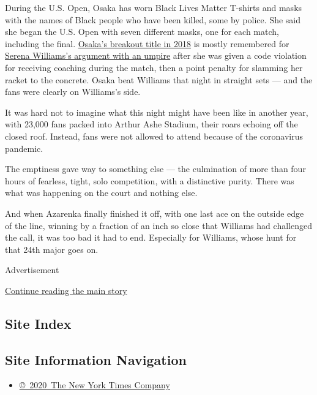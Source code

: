 During the U.S. Open, Osaka has worn Black Lives Matter T-shirts and
masks with the names of Black people who have been killed, some by
police. She said she began the U.S. Open with seven different masks, one
for each match, including the final.
\href{https://www.nytimes3xbfgragh.onion/2018/09/10/sports/tennis/us-open-naomi-osaka-serena-williams.html}{Osaka's
breakout title in 2018} is mostly remembered for
\href{https://www.nytimes3xbfgragh.onion/2018/09/09/sports/serena-osaka-us-open-penalty.html}{Serena
Williams's argument with an umpire} after she was given a code violation
for receiving coaching during the match, then a point penalty for
slamming her racket to the concrete. Osaka beat Williams that night in
straight sets --- and the fans were clearly on Williams's side.

It was hard not to imagine what this night might have been like in
another year, with 23,000 fans packed into Arthur Ashe Stadium, their
roars echoing off the closed roof. Instead, fans were not allowed to
attend because of the coronavirus pandemic.

The emptiness gave way to something else --- the culmination of more
than four hours of fearless, tight, solo competition, with a distinctive
purity. There was what was happening on the court and nothing else.

And when Azarenka finally finished it off, with one last ace on the
outside edge of the line, winning by a fraction of an inch so close that
Williams had challenged the call, it was too bad it had to end.
Especially for Williams, whose hunt for that 24th major goes on.

Advertisement

\protect\hyperlink{after-bottom}{Continue reading the main story}

\hypertarget{site-index}{%
\subsection{Site Index}\label{site-index}}

\hypertarget{site-information-navigation}{%
\subsection{Site Information
Navigation}\label{site-information-navigation}}

\begin{itemize}
\tightlist
\item
  \href{https://help.nytimes3xbfgragh.onion/hc/en-us/articles/115014792127-Copyright-notice}{©~2020~The
  New York Times Company}
\end{itemize}

